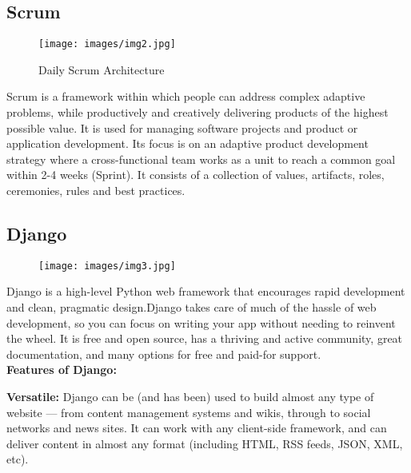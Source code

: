\documentclass[12pt]{article}
\begin{document}
\subsection{\large{Scrum}}
\begin{figure}[ht]
\centering
\texttt{[image: images/img2.jpg]}
\caption{Daily Scrum Architecture }
\label{fig:example}
\end{figure}
\hspace{1cm}Scrum is a framework within which people can address complex adaptive problems, while productively and creatively delivering products of the highest possible value. It is used for managing software projects and product or application development. Its focus is on an adaptive product development strategy where a cross-functional team works as a unit to reach a common goal within 2-4 weeks (Sprint). It consists of a collection of values, artifacts, roles, ceremonies, rules and best practices. \\ \smallskip

\subsection{\large{Django}}
\begin{figure}[ht]
\centering
\texttt{[image: images/img3.jpg]}
\label{fig:example}
\end{figure}
\hspace{1cm}Django is a high-level Python web framework that encourages rapid development and clean, pragmatic design.Django takes care of much of the hassle of web development, so you can focus on writing your app without needing to reinvent the wheel. It is free and open source, has a thriving and active community, great documentation, and many options for free and paid-for support.\\ \smallskip
\textbf{Features of Django: }\smallskip

\hspace{1cm}\textbf{Versatile: }Django can be (and has been) used to build almost any type of website — from content management systems and wikis, through to social networks and news sites. It can work with any client-side framework, and can deliver content in almost any format (including HTML, RSS feeds, JSON, XML, etc). \\ \smallskip
\end{document}
